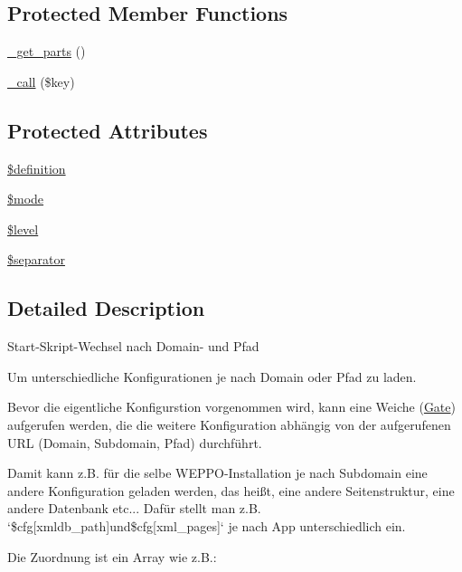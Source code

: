 \subsection*{Protected Member Functions}
\begin{DoxyCompactItemize}
\item 
\hyperlink{classWEPPO_1_1Routing_1_1Gate_a5ef1ce1bfce8ed10fe5cd19292d47ee4}{\+\_\+get\+\_\+parts} ()
\item 
\hyperlink{classWEPPO_1_1Routing_1_1Gate_af9605f0498bfd014156c3a0f4d890e62}{\+\_\+call} (\$key)
\end{DoxyCompactItemize}
\subsection*{Protected Attributes}
\begin{DoxyCompactItemize}
\item 
\hyperlink{classWEPPO_1_1Routing_1_1Gate_ad509062f07757873c558f2b3a20b9a71}{\$definition}
\item 
\hyperlink{classWEPPO_1_1Routing_1_1Gate_a39c9b5f7432b888f5a752913290c39a8}{\$mode}
\item 
\hyperlink{classWEPPO_1_1Routing_1_1Gate_a8728048a96c0b706eb1c0cfa526921b4}{\$level}
\item 
\hyperlink{classWEPPO_1_1Routing_1_1Gate_ab3c74fc204264f562ee3bc8a34b77bac}{\$separator}
\end{DoxyCompactItemize}


\subsection{Detailed Description}
Start-\/\+Skript-\/\+Wechsel nach Domain-\/ und Pfad

Um unterschiedliche Konfigurationen je nach Domain oder Pfad zu laden.

Bevor die eigentliche Konfigurstion vorgenommen wird, kann eine Weiche (\hyperlink{classWEPPO_1_1Routing_1_1Gate}{Gate}) aufgerufen werden, die die weitere Konfiguration abhängig von der aufgerufenen U\+RL (Domain, Subdomain, Pfad) durchführt.

Damit kann z.\+B. für die selbe W\+E\+P\+P\+O-\/\+Installation je nach Subdomain eine andere Konfiguration geladen werden, das heißt, eine andere Seitenstruktur, eine andere Datenbank etc... Dafür stellt man z.\+B. `\$cfg\mbox{[}\textquotesingle{}xmldb\+\_\+path\textquotesingle{}\mbox{]}{\ttfamily und}\$cfg\mbox{[}\textquotesingle{}xml\+\_\+pages\textquotesingle{}\mbox{]}` je nach App unterschiedlich ein. \begin{DoxyVerb}Die Zuordnung ist ein Array wie z.B.:
\end{DoxyVerb}
 
